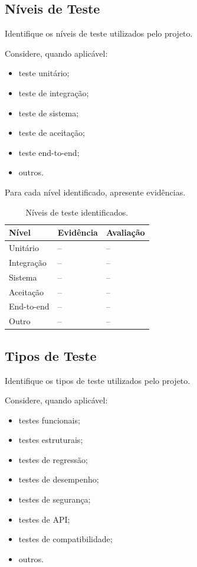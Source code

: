 \subsection{Níveis de Teste}

Identifique os níveis de teste utilizados pelo projeto.

Considere, quando aplicável:

\begin{itemize}
    \item teste unitário;
    \item teste de integração;
    \item teste de sistema;
    \item teste de aceitação;
    \item teste end-to-end;
    \item outros.
\end{itemize}

Para cada nível identificado, apresente evidências.

\begin{table}[H]
\centering
\caption{Níveis de teste identificados.}
\label{tab:niveis}
\begin{tabularx}{\textwidth}{l X X}
\toprule
\textbf{Nível} & \textbf{Evidência} & \textbf{Avaliação} \\
\midrule
Unitário & -- & -- \\
Integração & -- & -- \\
Sistema & -- & -- \\
Aceitação & -- & -- \\
End-to-end & -- & -- \\
Outro & -- & -- \\
\bottomrule
\end{tabularx}
\end{table}



\subsection{Tipos de Teste}

Identifique os tipos de teste utilizados pelo projeto.

Considere, quando aplicável:

\begin{itemize}
    \item testes funcionais;
    \item testes estruturais;
    \item testes de regressão;
    \item testes de desempenho;
    \item testes de segurança;
    \item testes de API;
    \item testes de compatibilidade;
    \item outros.
\end{itemize}

